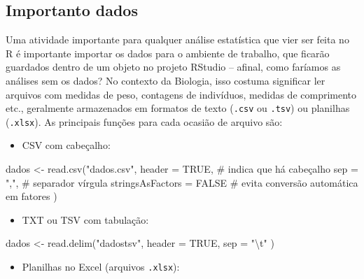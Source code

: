 \documentclass[
  12pt,
  letterpaper,
  DIV=11,
  numbers=noendperiod]{scrreprt}
\newenvironment{Shaded}{\begin{snugshade}}{\end{snugshade}}
\newcommand{\AttributeTok}[1]{\textcolor[rgb]{0.40,0.45,0.13}{#1}}
\newcommand{\CommentTok}[1]{\textcolor[rgb]{0.37,0.37,0.37}{#1}}
\newcommand{\ConstantTok}[1]{\textcolor[rgb]{0.56,0.35,0.01}{#1}}
\newcommand{\FunctionTok}[1]{\textcolor[rgb]{0.28,0.35,0.67}{#1}}
\newcommand{\NormalTok}[1]{\textcolor[rgb]{0.00,0.23,0.31}{#1}}
\newcommand{\OtherTok}[1]{\textcolor[rgb]{0.00,0.23,0.31}{#1}}
\newcommand{\SpecialCharTok}[1]{\textcolor[rgb]{0.37,0.37,0.37}{#1}}
\newcommand{\StringTok}[1]{\textcolor[rgb]{0.13,0.47,0.30}{#1}}
\providecommand{\tightlist}{%
  \setlength{\itemsep}{0pt}\setlength{\parskip}{0pt}}\usepackage{longtable,booktabs,array}
\theoremstyle{definition}
\theoremstyle{exemplo}
\begin{document}
\subsection{Importanto dados}\label{importanto-dados}

Uma atividade importante para qualquer análise estatística que vier ser
feita no R é importante importar os dados para o ambiente de trabalho,
que ficarão guardados dentro de um objeto no projeto RStudio -- afinal,
como faríamos as análises sem os dados? No contexto da Biologia, isso
costuma significar ler arquivos com medidas de peso, contagens de
indivíduos, medidas de comprimento etc., geralmente armazenados em
formatos de texto (\texttt{.csv} ou \texttt{.tsv}) ou planilhas
(\texttt{.xlsx}). As principais funções para cada ocasião de arquivo
são:

\begin{itemize}
\tightlist
\item
  CSV com cabeçalho:
\end{itemize}

\begin{Shaded}
\begin{Highlighting}[]
\NormalTok{dados }\OtherTok{\textless{}{-}} \FunctionTok{read.csv}\NormalTok{(}\StringTok{"dados.csv"}\NormalTok{,}
  \AttributeTok{header =} \ConstantTok{TRUE}\NormalTok{, }\CommentTok{\# indica que há cabeçalho}
  \AttributeTok{sep    =} \StringTok{","}\NormalTok{,  }\CommentTok{\# separador vírgula}
  \AttributeTok{stringsAsFactors =} \ConstantTok{FALSE} \CommentTok{\# evita conversão automática em fatores}
\NormalTok{)}
\end{Highlighting}
\end{Shaded}

\begin{itemize}
\tightlist
\item
  TXT ou TSV com tabulação:
\end{itemize}

\begin{Shaded}
\begin{Highlighting}[]
\NormalTok{dados }\OtherTok{\textless{}{-}} \FunctionTok{read.delim}\NormalTok{(}\StringTok{"dadostsv"}\NormalTok{, }
  \AttributeTok{header =} \ConstantTok{TRUE}\NormalTok{, }
  \AttributeTok{sep    =} \StringTok{"}\SpecialCharTok{\textbackslash{}t}\StringTok{"}
\NormalTok{)}
\end{Highlighting}
\end{Shaded}

\begin{itemize}
\tightlist
\item
  Planilhas no Excel (arquivos \texttt{.xlsx}):
\end{itemize}
\end{document}

